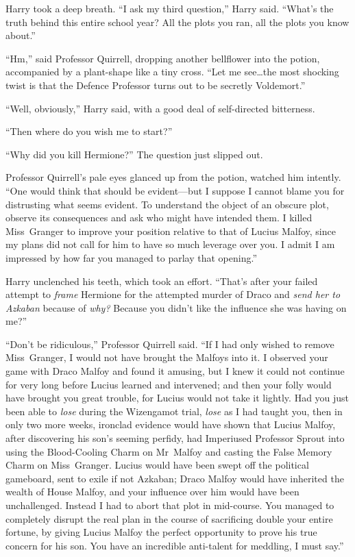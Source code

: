 Harry took a deep breath. “I ask my third question,” Harry said. “What’s the
truth behind this entire school year? All the plots you ran, all the plots you
know about.”

“Hm,” said Professor Quirrell, dropping another bellflower into the potion,
accompanied by a plant-shape like a tiny cross. “Let me see…the most
shocking twist is that the Defence Professor turns out to be secretly
Voldemort.”

“Well, obviously,” Harry said, with a good deal of self-directed bitterness.

“Then where do you wish me to start?”

“Why did you kill Hermione?” The question just slipped out.

Professor Quirrell’s pale eyes glanced up from the potion, watched him
intently. “One would think that should be evident—but I suppose I cannot
blame you for distrusting what seems evident. To understand the object of an
obscure plot, observe its consequences and ask who might have intended them. I
killed Miss~Granger to improve your position relative to that of Lucius Malfoy,
since my plans did not call for him to have so much leverage over you. I admit
I am impressed by how far you managed to parlay that opening.”

Harry unclenched his teeth, which took an effort. “That’s after your failed
attempt to \emph{frame} Hermione for the attempted murder of Draco and
\emph{send her to Azkaban} because of \emph{why?} Because you didn’t like the
influence she was having on me?”

“Don’t be ridiculous,” Professor Quirrell said. “If I had only wished to remove
Miss~Granger, I would not have brought the Malfoys into it. I observed your
game with Draco Malfoy and found it amusing, but I knew it could not continue
for very long before Lucius learned and intervened; and then your folly would
have brought you great trouble, for Lucius would not take it lightly. Had you
just been able to \emph{lose} during the Wizengamot trial, \emph{lose} as I had
taught you, then in only two more weeks, ironclad evidence would have shown
that Lucius Malfoy, after discovering his son’s seeming perfidy, had Imperiused
Professor Sprout into using the Blood-Cooling Charm on Mr~Malfoy and casting
the False Memory Charm on Miss~Granger. Lucius would have been swept off the
political gameboard, sent to exile if not Azkaban; Draco Malfoy would have
inherited the wealth of House Malfoy, and your influence over him would have
been unchallenged. Instead I had to abort that plot in mid-course. You managed
to completely disrupt the real plan in the course of sacrificing double your
entire fortune, by giving Lucius Malfoy the perfect opportunity to prove his
true concern for his son. You have an incredible anti-talent for meddling, I
must say.”

